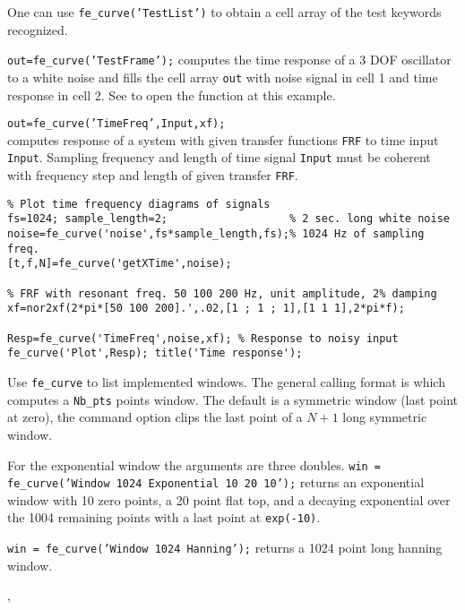 One can use {\tt fe\_curve('TestList')} to obtain a cell array of the test keywords recognized.


{\tt out=fe\_curve('TestFrame');} computes the time response of a 3 DOF oscillator to a white noise and fills the cell array {\tt out} with noise signal in cell 1 and time response in cell 2. See  to open the function at this example.



{\tt out=fe\_curve('TimeFreq',Input,xf);} \\
computes response of a system with given transfer functions {\tt FRF} to time input {\tt Input}. Sampling frequency and length of time signal {\tt Input} must be coherent with frequency step and length of given transfer {\tt FRF}.

\begin{verbatim}
% Plot time frequency diagrams of signals
fs=1024; sample_length=2;                   % 2 sec. long white noise
noise=fe_curve('noise',fs*sample_length,fs);% 1024 Hz of sampling freq.
[t,f,N]=fe_curve('getXTime',noise);

% FRF with resonant freq. 50 100 200 Hz, unit amplitude, 2% damping 
xf=nor2xf(2*pi*[50 100 200].',.02,[1 ; 1 ; 1],[1 1 1],2*pi*f);

Resp=fe_curve('TimeFreq',noise,xf); % Response to noisy input
fe_curve('Plot',Resp); title('Time response');
\end{verbatim}%



Use {\tt fe\_curve}  to list implemented windows. The general calling format is  which computes a {\tt {\ti Nb\_pts}} points window. The default is a symmetric window (last point at zero), the command option  clips the last point of a $N+1$ long symmetric window. 

For the exponential window the arguments are three doubles. {\tt win = fe\_curve('Window 1024 Exponential 10 20 10');} returns an exponential window with 10 zero points, a 20 point flat top, and a decaying exponential over the 1004 remaining points with a last point at {\tt exp(-10)}.


{\tt win = fe\_curve('Window 1024 Hanning');} returns a 1024 point long hanning window.



\noindent \feload, \fecase








